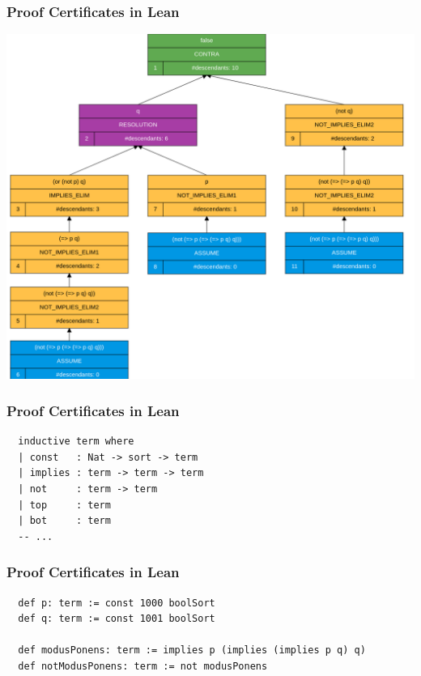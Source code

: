 \documentclass[usepdftitle=false,aspectratio=169,usenames,dvipsnames]{beamer}
\begin{document}
\begin{frame}
  \frametitle{Proof Certificates in Lean}
  \centering
  \includegraphics[height=0.8\textheight]{images/mp_cvc5_proof.png}
\end{frame}

\begin{frame}[fragile]
  \frametitle{Proof Certificates in Lean}
  \begin{verbatim}
  inductive term where
  | const   : Nat -> sort -> term
  | implies : term -> term -> term
  | not     : term -> term
  | top     : term
  | bot     : term
  -- ...
  \end{verbatim}
\end{frame}

\begin{frame}[fragile]
  \frametitle{Proof Certificates in Lean}
  \begin{verbatim}
  def p: term := const 1000 boolSort
  def q: term := const 1001 boolSort

  def modusPonens: term := implies p (implies (implies p q) q)
  def notModusPonens: term := not modusPonens
  \end{verbatim}
\end{frame}
\end{document}
